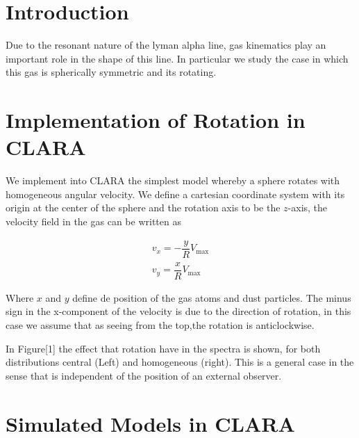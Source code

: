 \documentclass{article}
\theoremstyle{definition}
\theoremstyle{remark}
\begin{document}
\section{Introduction}

Due to the resonant nature of the lyman alpha line, gas kinematics
play an important role in the shape of this line. In particular we
study the case in which this gas is spherically symmetric and its
rotating.


\section{Implementation of Rotation in CLARA}

We implement into CLARA the simplest model whereby a sphere rotates
with homogeneous angular velocity. We define a cartesian coordinate
system with its origin at the center of the sphere and the rotation
axis to be the $z$-axis, the velocity field in the gas can be written as


\begin{subequations}
\begin{align}
    v_{x}=-\dfrac{y}{R}V_{\max} \label{subeq1}\\
    v_{y}=\dfrac{x}{R}V_{\max} \label{subeq2}
\end{align}
\end{subequations}

Where $x$ and $y$ define de position of the gas atoms and dust
particles. The minus sign in the x-component of the velocity is due to
the direction of rotation, in this case we assume that as seeing from
the top,the rotation is anticlockwise.

In Figure[1] the effect that rotation have in the spectra is shown,
for both distributions central (Left) and homogeneous (right). This is
a general case in the sense that is independent of the position of an
external observer.  


\section{Simulated Models in CLARA}
\label{sec:models}

\end{document}
